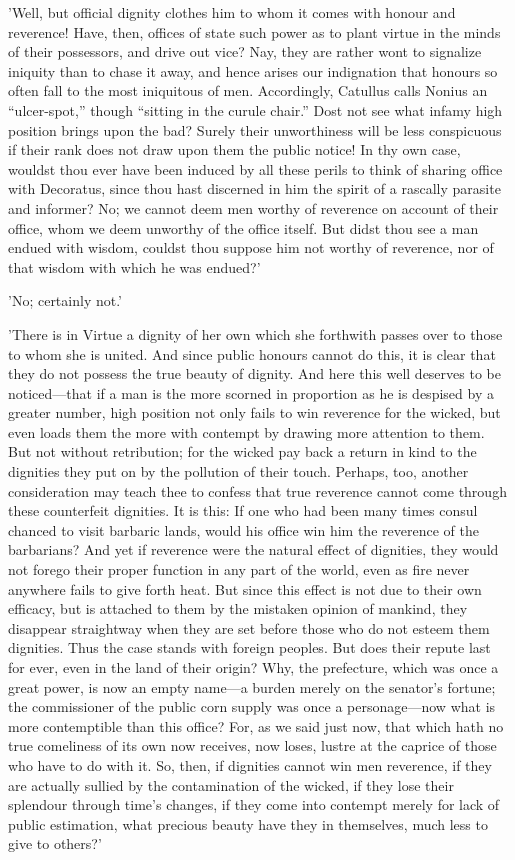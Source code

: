 'Well, but official dignity clothes him to whom it comes with honour and
reverence! Have, then, offices of state such power as to plant virtue in
the minds of their possessors, and drive out vice? Nay, they are rather
wont to signalize iniquity than to chase it away, and hence arises our
indignation that honours so often fall to the most iniquitous of men.
Accordingly, Catullus calls Nonius an ``ulcer-spot,'' though ``sitting in
the curule chair.'' Dost not see what infamy high position brings upon
the bad? Surely their unworthiness will be less conspicuous if their
rank does not draw upon them the public notice! In thy own case, wouldst
thou ever have been induced by all these perils to think of sharing
office with Decoratus, since thou hast discerned in him the spirit of a
rascally parasite and informer? No; we cannot deem men worthy of
reverence on account of their office, whom we deem unworthy of the
office itself. But didst thou see a man endued with wisdom, couldst thou
suppose him not worthy of reverence, nor of that wisdom with which he
was endued?'

'No; certainly not.'

'There is in Virtue a dignity of her own which she forthwith passes over
to those to whom she is united. And since public honours cannot do this,
it is clear that they do not possess the true beauty of dignity. And
here this well deserves to be noticed—that if a man is the more scorned
in proportion as he is despised by a greater number, high position not
only fails to win reverence for the wicked, but even loads them the more
with contempt by drawing more attention to them. But not without
retribution; for the wicked pay back a return in kind to the dignities
they put on by the pollution of their touch. Perhaps, too, another
consideration may teach thee to confess that true reverence cannot come
through these counterfeit dignities. It is this: If one who had been
many times consul chanced to visit barbaric lands, would his office win
him the reverence of the barbarians? And yet if reverence were the
natural effect of dignities, they would not forego their proper function
in any part of the world, even as fire never anywhere fails to give
forth heat. But since this effect is not due to their own efficacy, but
is attached to them by the mistaken opinion of mankind, they disappear
straightway when they are set before those who do not esteem them
dignities. Thus the case stands with foreign peoples. But does their
repute last for ever, even in the land of their origin? Why, the
prefecture, which was once a great power, is now an empty name—a burden
merely on the senator's fortune; the commissioner of the public corn
supply was once a personage—now what is more contemptible than this
office? For, as we said just now, that which hath no true comeliness of
its own now receives, now loses, lustre at the caprice of those who have
to do with it. So, then, if dignities cannot win men reverence, if they
are actually sullied by the contamination of the wicked, if they lose
their splendour through time's changes, if they come into contempt
merely for lack of public estimation, what precious beauty have they in
themselves, much less to give to others?'


